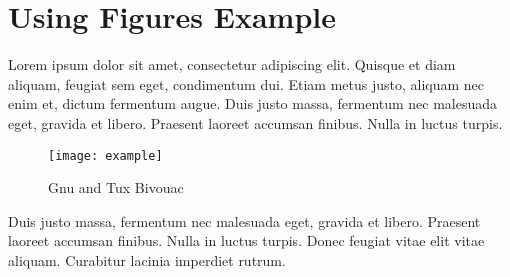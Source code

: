 %
%
%

\section{\label{sec:usingfigures}Using Figures Example}

Lorem ipsum dolor sit amet, consectetur adipiscing elit. Quisque et diam aliquam, feugiat sem eget, condimentum dui.
Etiam metus justo, aliquam nec enim et, dictum fermentum augue. Duis justo massa, fermentum nec malesuada eget, gravida
et libero. Praesent laoreet accumsan finibus. Nulla in luctus turpis.

\begin{figure}[h]\label{fig:example}
	\texttt{[image: example]}
	\caption{Gnu and Tux Bivouac}
\end{figure}

Duis justo massa, fermentum nec malesuada eget, gravida et libero. Praesent laoreet accumsan finibus. Nulla in luctus
turpis. Donec feugiat vitae elit vitae aliquam. Curabitur lacinia imperdiet rutrum.
